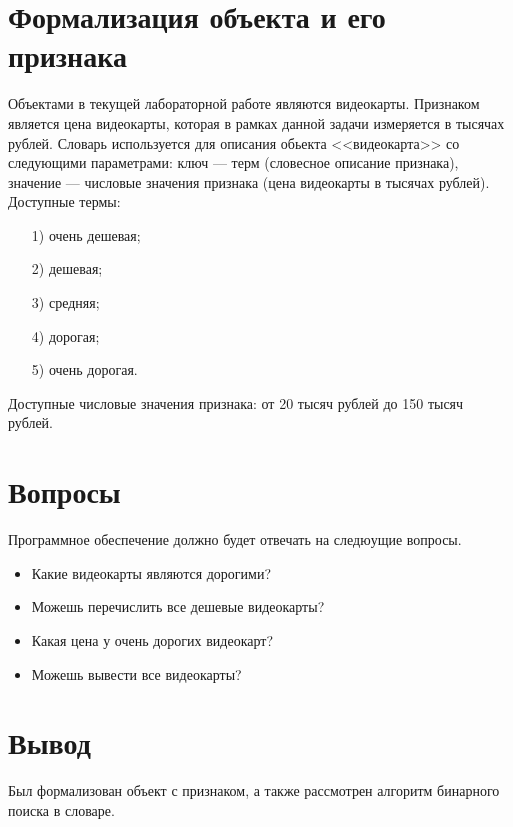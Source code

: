 \section{Формализация объекта и его признака}

Объектами в текущей лабораторной работе являются видеокарты. 
Признаком является цена видеокарты, которая в рамках данной задачи измеряется в тысячах рублей. 
Словарь используется для описания обьекта <<видеокарта>> со следующими параметрами: ключ --- терм (словесное описание признака), значение --- числовые значения признака (цена видеокарты в тысячах рублей). 
Доступные термы:

\begin{itemize}[label=---]
	\item[1)] очень дешевая;
	\item[2)] дешевая;
	\item[3)] средняя;
	\item[4)] дорогая;
	\item[5)] очень дорогая.
\end{itemize}

Доступные числовые значения признака: от 20 тысяч рублей до 150 тысяч рублей.

\section{Вопросы}

Программное обеспечение должно будет отвечать на следюущие вопросы.
\begin{itemize}[label=---]
	\item Какие видеокарты являются дорогими?
	\item Можешь перечислить все дешевые видеокарты?
	\item Какая цена у очень дорогих видеокарт?
	\item Можешь вывести все видеокарты?
\end{itemize}

\section*{Вывод}

Был формализован объект с признаком, а также рассмотрен алгоритм бинарного поиска в словаре.
